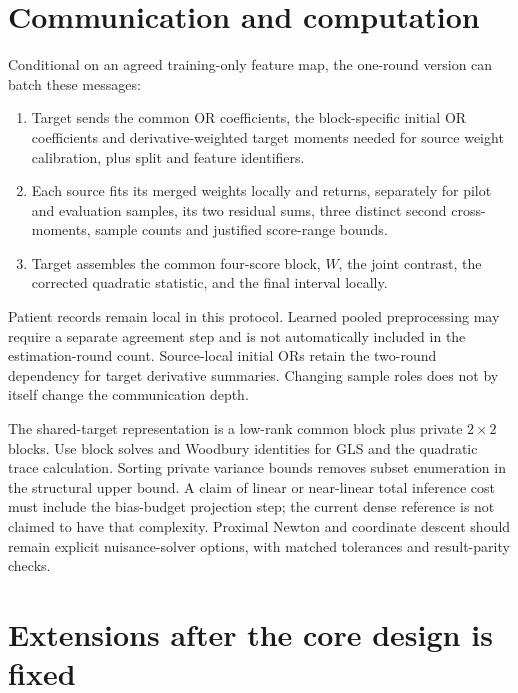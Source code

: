 \section{Communication and computation}

Conditional on an agreed training-only feature map, the one-round version
can batch these messages:
\begin{enumerate}
\item Target sends the common OR coefficients, the block-specific initial
OR coefficients and derivative-weighted target moments needed for source
weight calibration, plus split and feature identifiers.
\item Each source fits its merged weights locally and returns, separately for
pilot and evaluation samples, its two residual sums, three distinct second
cross-moments, sample counts and justified score-range bounds.
\item Target assembles the common four-score block, $W$, the joint contrast,
the corrected quadratic statistic, and the final interval locally.
\end{enumerate}
Patient records remain local in this protocol. Learned pooled preprocessing
may require a separate agreement step and is not automatically included in
the estimation-round count. Source-local initial ORs retain the two-round
dependency for target derivative summaries. Changing sample roles does not
by itself change the communication depth.

The shared-target representation is a low-rank common block plus private
$2\times2$ blocks. Use block solves and Woodbury identities for GLS and the
quadratic trace calculation. Sorting private variance bounds removes subset
enumeration in the structural upper bound. A claim of linear or near-linear
total inference cost must include the bias-budget projection step; the
current dense reference is not claimed to have that complexity. Proximal
Newton and coordinate descent should remain explicit nuisance-solver options,
with matched tolerances and result-parity checks.

\section{Extensions after the core design is fixed}

